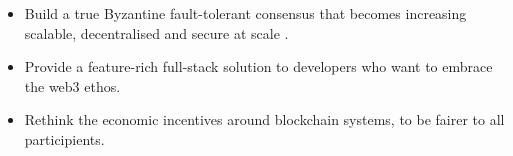 \begin{itemize}
\item Build a true Byzantine fault-tolerant consensus that becomes increasing scalable, decentralised and secure at scale  .
\item Provide a feature-rich full-stack solution to developers who want to embrace the web3 ethos.
\item Rethink the economic incentives around blockchain systems, to be fairer to all participients.
\end{itemize}


\begin{comment}
NB - To be moved to the DFS section?

Catalyst solves this problem through the integration of a Distributed File System (DFS). This enables much more control for peers on the network in terms of what elements of the ledger they hold. This means that lightweight nodes can run with only a subset of the network data. Furthermore, large data files can be securely held on the ledger without causing issues for other nodes due to bloating.


\end{comment}